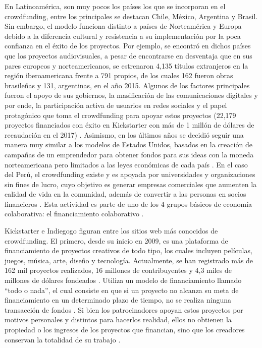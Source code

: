 En Latinoamérica, son muy pocos los países los que se incorporan en el crowdfunding, entre los principales se destacan Chile, México, Argentina y Brasil. Sin embargo, el modelo funciona distinto a países de Norteamérica y Europa debido a la diferencia cultural y resistencia a su implementación por la poca confianza en el éxito de los proyectos. Por ejemplo, se encontró en dichos países que los proyectos audiovisuales, a pesar de encontrarse en desventaja que en sus pares europeos y norteamericanos, se estrenaron 4,135 títulos extranjeros en la región iberoamericana frente a 791 propios, de los cuales 162 fueron obras brasileñas y 131, argentinas, en el año 2015. Algunos de los factores principales fueron el apoyo de sus gobiernos, la masificación de las comunicaciones digitales y por ende, la participación activa de usuarios en redes sociales y el papel protagónico que toma el crowdfunding para apoyar estos proyectos (22,179 proyectos financiados con éxito en Kickstarter con más de 1 millón de dólares de recaudación en el 2017) \parencite{cr_lopezgolan2017crowdfunding}. Asimismo, en los últimos años se decidió seguir una manera muy similar a los modelos de Estados Unidos, basados en la creación de campañas de un emprendedor para obtener fondos para sus ideas con la moneda norteamericana pero limitados a las leyes económicas de cada país \parencite{cr_sl_crowdfundlatam}. En el caso del Perú, el crowdfunding existe y es apoyada por universidades y organizaciones sin fines de lucro, cuyo objetivo es generar empresas comerciales que aumenten la calidad de vida en la comunidad, además de convertir a las personas en socios financieros \parencite{cr_fernandezbedoya2020colecoperu}. Esta actividad es parte de uno de los 4 grupos básicos de economía colaborativa: el financiamiento colaborativo \parencite{cr_stokes2014coleco}.

Kickstarter e Indiegogo figuran entre los sitios web más conocidos de crowdfunding. El primero, desde su inicio en 2009, es una plataforma de financiamiento de proyectos creativos de todo tipo, los cuales incluyen películas, juegos, música, arte, diseño y tecnología. Actualmente, se han registrado más de 162 mil proyectos realizados, 16 millones de contribuyentes y 4,3 miles de millones de dólares fondeados \parencite{cr_kickstarter_about}. Utiliza un modelo de financiamiento llamado “todo o nada”, el cual consiste en que si un proyecto no alcanza su meta de financiamiento en un determinado plazo de tiempo, no se realiza ninguna transacción de fondos \parencite{cr_kickstarter_founding}. Si bien los patrocinadores apoyan estos proyectos por motivos personales y distintos para hacerlos realidad, ellos no obtienen la propiedad o los ingresos de los proyectos que financian, sino que los creadores conservan la totalidad de su trabajo \parencite{cr_kickstarter_press}.

